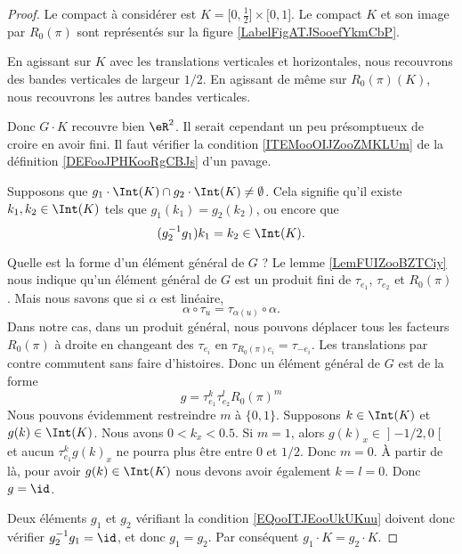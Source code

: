 \begin{proof}
	Le compact à considérer est \( K=\mathopen[ 0 , \frac{ 1 }{2} \mathclose]\times \mathopen[ 0 , 1 \mathclose]\). Le compact \( K\) et son image par \( R_0(\pi)\) sont représentés sur la figure \ref{LabelFigATJSooefYkmCbP}. %

	En agissant sur \( K\) avec les translations verticales et horizontales, nous recouvrons des bandes verticales de largeur \( 1/2\). En agissant de même sur \( R_0(\pi)(K) \), nous recouvrons les autres bandes verticales.

	Donc \( G\cdot K\) recouvre bien \( \eR^2\). Il serait cependant un peu présomptueux de croire en avoir fini. Il faut vérifier la condition \ref{ITEMooOIJZooZMKLUm} de la définition \ref{DEFooJPHKooRgCBJs} d'un pavage.

	Supposons que \( g_1\cdot\Int(K)\cap g_2\cdot \Int(K)\neq \emptyset\). Cela signifie qu'il existe \( k_1,k_2\in \Int(K)\) tels que \( g_1(k_1)=g_2(k_2)\), ou encore que
	\begin{equation}        \label{EQooITJEooUkUKuu}
		(g_2^{-1}g_1)k_1=k_2\in \Int(K).
	\end{equation}

	Quelle est la forme d'un élément général de \( G\) ? Le lemme \ref{LemFUIZooBZTCiy} nous indique qu'un élément général de \( G\) est un produit fini de \( \tau_{e_1}\), \( \tau_{e_2}\) et \( R_0(\pi)\). Mais nous savons que si \( \alpha\) est linéaire,
	\begin{equation}
		\alpha\circ \tau_u=\tau_{\alpha(u)}\circ \alpha.
	\end{equation}
	Dans notre cas, dans un produit général, nous pouvons déplacer tous les facteurs \( R_0(\pi)\) à droite en changeant des \( \tau_{e_i}\) en \( \tau_{R_0(\pi)e_i}=\tau_{-e_i}\). Les translations par contre commutent sans faire d'histoires. Donc un élément général de \( G\) est de la forme
	\begin{equation}
		g=\tau_{e_1}^k\tau_{e_2}^lR_0(\pi)^m
	\end{equation}
	Nous pouvons évidemment restreindre \( m\) à \( \{ 0,1 \}\). Supposons \( k\in \Int(K)\) et \( g(k)\in \Int(K)\). Nous avons \( 0<k_x<0.5\). Si \(m=1 \), alors \( g(k)_x\in\mathopen] -1/2 , 0 \mathclose[\) et aucun \( \tau_{e_1}^kg(k)_x\) ne pourra plus être entre \( 0\) et \( 1/2\). Donc \( m=0\). À partir de là, pour avoir \( g(k)\in \Int(K)\) nous devons avoir également \( k=l=0\). Donc \( g=\id\).

	Deux éléments \( g_1\) et \( g_2\) vérifiant la condition \eqref{EQooITJEooUkUKuu} doivent donc vérifier \( g_2^{-1}g_1=\id\), et donc \( g_1=g_2\). Par conséquent \( g_1\cdot K=g_2\cdot K\).
\end{proof}

